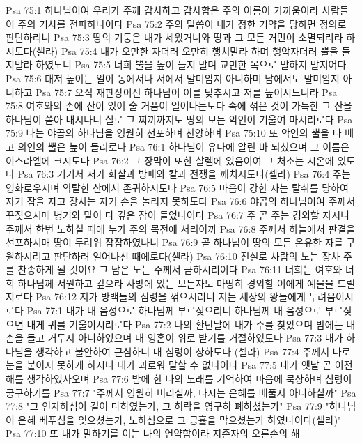 Psa 75:1  하나님이여 우리가 주께 감사하고 감사함은 주의 이름이 가까움이라 사람들이 주의 기사를 전파하나이다
Psa 75:2  주의 말씀이 내가 정한 기약을 당하면 정의로 판단하리니
Psa 75:3  땅의 기둥은 내가 세웠거니와 땅과 그 모든 거민이 소멸되리라 하시도다(셀라)
Psa 75:4  내가 오만한 자더러 오만히 행치말라 하며 행악자더러 뿔을 들지말라 하였노니
Psa 75:5  너희 뿔을 높이 들지 말며 교만한 목으로 말하지 말지어다
Psa 75:6  대저 높이는 일이 동에서나 서에서 말미암지 아니하며 남에서도 말미암지 아니하고
Psa 75:7  오직 재판장이신 하나님이 이를 낮추시고 저를 높이시느니라
Psa 75:8  여호와의 손에 잔이 있어 술 거품이 일어나는도다 속에 섞은 것이 가득한 그 잔을 하나님이 쏟아 내시나니 실로 그 찌끼까지도 땅의 모든 악인이 기울여 마시리로다
Psa 75:9  나는 야곱의 하나님을 영원히 선포하며 찬양하며
Psa 75:10  또 악인의 뿔을 다 베고 의인의 뿔은 높이 들리로다
Psa 76:1  하나님이 유다에 알린 바 되셨으며 그 이름은 이스라엘에 크시도다
Psa 76:2  그 장막이 또한 살렘에 있음이여 그 처소는 시온에 있도다
Psa 76:3  거기서 저가 화살과 방패와 칼과 전쟁을 깨치시도다(셀라)
Psa 76:4  주는 영화로우시며 약탈한 산에서 존귀하시도다
Psa 76:5  마음이 강한 자는 탈취를 당하여 자기 잠을 자고 장사는 자기 손을 놀리지 못하도다
Psa 76:6  야곱의 하나님이여 주께서 꾸짖으시매 병거와 말이 다 깊은 잠이 들었나이다
Psa 76:7  주 곧 주는 경외할 자시니 주께서 한번 노하실 때에 누가 주의 목전에 서리이까
Psa 76:8  주께서 하늘에서 판결을 선포하시매 땅이 두려워 잠잠하였나니
Psa 76:9  곧 하나님이 땅의 모든 온유한 자를 구원하시려고 판단하러 일어나신 때에로다(셀라)
Psa 76:10  진실로 사람의 노는 장차 주를 찬송하게 될 것이요 그 남은 노는 주께서 금하시리이다
Psa 76:11  너희는 여호와 너희 하나님께 서원하고 갚으라 사방에 있는 모든자도 마땅히 경외할 이에게 예물을 드릴지로다
Psa 76:12  저가 방백들의 심령을 꺾으시리니 저는 세상의 왕들에게 두려움이시로다
Psa 77:1  내가 내 음성으로 하나님께 부르짖으리니 하나님께 내 음성으로 부르짖으면 내게 귀를 기울이시리로다
Psa 77:2  나의 환난날에 내가 주를 찾았으며 밤에는 내 손을 들고 거두지 아니하였으며 내 영혼이 위로 받기를 거절하였도다
Psa 77:3  내가 하나님을 생각하고 불안하여 근심하니 내 심령이 상하도다 (셀라)
Psa 77:4  주께서 나로 눈을 붙이지 못하게 하시니 내가 괴로워 말할 수 없나이다
Psa 77:5  내가 옛날 곧 이전 해를 생각하였사오며
Psa 77:6  밤에 한 나의 노래를 기억하여 마음에 묵상하며 심령이 궁구하기를
Psa 77:7  "주께서 영원히 버리실까, 다시는 은혜를 베풀지 아니하실까"
Psa 77:8  "그 인자하심이 길이 다하였는가, 그 허락을 영구히 폐하셨는가"
Psa 77:9  "하나님이 은혜 베푸심을 잊으셨는가, 노하심으로 그 긍휼을 막으셨는가 하였나이다(셀라)"
Psa 77:10  또 내가 말하기를 이는 나의 연약함이라 지존자의 오른손의 해
